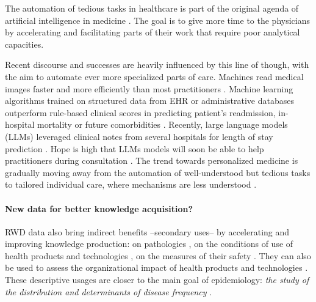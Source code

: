 \documentclass[french,12pt,twoside,a4paper]{book}
\begin{document}
The automation of tedious tasks in healthcare is part of the original agenda of
artificial intelligence in medicine \citep{schwartz1987artificial}. The goal is to give more time to the
physicians by accelerating and facilitating parts of their work that require
poor analytical capacities.

Recent discourse and successes are heavily influenced by this line of though,
with the aim to automate ever more specialized parts of care. Machines read
medical images faster and more efficiently than most practitioners
\citep{zhou2021review}. Machine learning algorithms trained on structured data
from EHR \citep{rajkomar2018scalable} or administrative
databases \citep{beaulieu2021machine} outperform rule-based clinical scores in
predicting patient's readmission, in-hospital mortality or future comorbidities
\citep{li2020behrt}. Recently, large language models (LLMs) leveraged clinical
notes from several hospitals for length of stay prediction
\citep{jiang2023health}. Hope is high that LLMs models will soon be able to help
practitioners during consultation \citep{lee2023benefits}. The trend towards
personalized medicine is gradually moving away from the automation of
well-understood but tedious tasks to tailored individual care, where mechanisms
are less understood \citep{schork2015personalized, topol2019high}.

\paragraph{New data for better knowledge acquisition?}

RWD data also bring indirect benefits --secondary uses-- by accelerating and
improving knowledge production: on pathologies
\citep{campbell_characterizing_2022}, on the conditions of use of health
products and technologies \citep{safran_toward_2007,tuppin_value_2017}, on the
measures of their safety \citep{wisniewski_development_2003}. They can also be
used to assess the organizational impact of health products and technologies
\citep{has_guide_2020,has_real-world_2021}. These descriptive usages are closer
to the main goal of epidemiology: \textit{the study of the distribution
  and determinants of disease frequency} \citep{macmahon1970epidemiology}.
\end{document}
